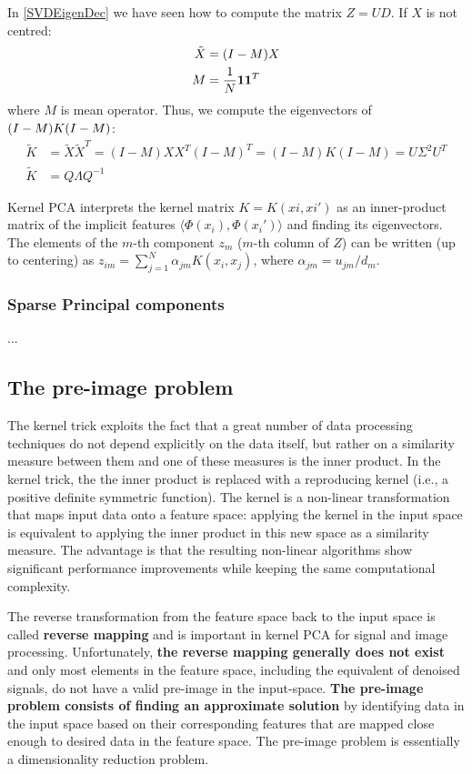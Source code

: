 \documentclass[12pt, letterpaper]{article}
\theoremstyle{definition}
\DeclarePairedDelimiter\autobracket{(}{)}
\newcommand{\br}[1]{\autobracket*{#1}}
\let\tb\textbf
\begin{document}
In \autoref{SVDEigenDec} we have seen how to compute the matrix $Z=UD$.
If $X$ is not centred:
\begin{equation}
\begin{aligned}
\tilde{X} &= \br{I - M}X\\
M &= \frac{1}{N}\mathbf{1}\mathbf{1}^T
\end{aligned}
\end{equation}
where $M$ is mean operator. Thus, we compute the eigenvectors of $\br{I-M}K\br{I-M}$:
\begin{equation}
\begin{aligned}
\tilde{K} &= \tilde{X}\tilde{X}^T = (I-M)XX^T(I-M)^T = (I-M)K(I-M) = U\Sigma^2U^T\\
\tilde{K} &= Q\Lambda Q^{-1}
\end{aligned}
\end{equation}

Kernel PCA interprets the kernel matrix $K = {K(xi,xi')}$ as an inner-product matrix of the implicit features $\langle\Phi(x_i ), \Phi(x_i')\rangle$ and finding its eigenvectors. 
The elements of the $m$-th component $z_m$ ($m$-th column of $Z$) can be written (up to centering) as $z_{im} = \sum^N_{j=1} \alpha_{jm}K(x_i, x_j )$, where $\alpha_{jm} = u_{jm}/d_m$.

\subsubsection{Sparse Principal components}
...
\subsection{The pre-image problem}
The kernel trick exploits the fact that a great number of data processing techniques do not depend explicitly on the data itself, but rather on a similarity measure between them and one of these measures is the inner product. In the kernel trick, the the inner product is replaced with a reproducing kernel (i.e.,  a positive definite symmetric function). The kernel is a non-linear transformation that maps input data onto a feature space: applying the kernel in the input space is equivalent to applying the inner product in this new space as a similarity measure. The advantage is that the resulting non-linear algorithms show significant performance improvements while keeping the same computational complexity.

The reverse transformation from the feature space back to the input space is called \tb{reverse mapping} and is important in kernel PCA for signal and image processing. Unfortunately, \tb{the reverse mapping generally does not exist} and only most elements in the feature space, including the equivalent of denoised signals, do not have a valid pre-image in the input-space. \tb{The pre-image problem consists of finding an approximate solution} by identifying data in the input space based on their corresponding features that are mapped close enough to desired data in the feature space. The pre-image problem is essentially a dimensionality reduction problem.
\end{document}
